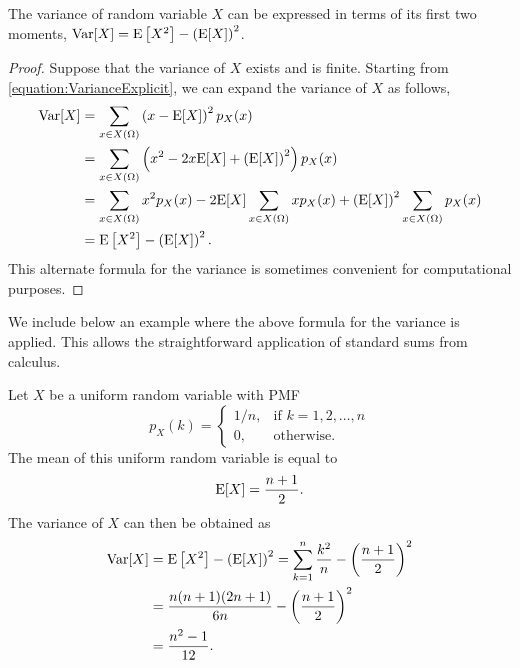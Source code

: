\begin{proposition}
The variance of random variable $X$ can be expressed in terms of its first two moments,
$\mathrm{Var} [X] = \mathrm{E} \left[ X^2 \right] - \left( \mathrm{E} [X] \right)^2$.
\end{proposition}
\begin{proof}
Suppose that the variance of $X$ exists and is finite.
Starting from \eqref{equation:VarianceExplicit}, we can expand the variance of $X$ as follows,
\begin{equation*}
\begin{split}
\mathrm{Var} [X] &= \sum_{x \in X(\Omega)} \left( x - \mathrm{E} [X] \right)^2 p_X (x) \\
&= \sum_{x \in X(\Omega)} \left( x^2 - 2 x \mathrm{E} [X] + \left( \mathrm{E} [X] \right)^2 \right) p_X (x) \\
&= \sum_{x \in X(\Omega)} x^2 p_X (x) - 2 \mathrm{E} [X] \sum_{x \in X(\Omega)} x p_X (x) + \left( \mathrm{E} [X] \right)^2 \sum_{x \in X(\Omega)} p_X (x) \\
&= \mathrm{E} \left[ X^2 \right] - \left( \mathrm{E} [X] \right)^2.
\end{split}
\end{equation*}
This alternate formula for the variance is sometimes convenient for computational purposes.
\end{proof}

We include below an example where the above formula for the variance is applied.
This allows the straightforward application of standard sums from calculus.

\begin{example}
Let $X$ be a uniform random variable with PMF
\begin{equation*}
p_X (k) = \left\{ \begin{array}{ll}
1/n, & \text{if }k = 1, 2, \ldots, n \\
0, & \text{otherwise} .
\end{array} \right.
\end{equation*}
The mean of this uniform random variable is equal to
\begin{equation*}
\mathrm{E} [X] = \frac{n+1}{2} .
\end{equation*}
The variance of $X$ can then be obtained as
\begin{equation*}
\begin{split}
\mathrm{Var} [X] &= \mathrm{E} \left[ X^2 \right] - \left( \mathrm{E} [X] \right)^2
= \sum_{k=1}^n \frac{k^2}{n} - \left( \frac{n+1}{2} \right)^2 \\
&= \frac{n(n+1)(2n+1)}{6n} - \left( \frac{n+1}{2} \right)^2 \\
&= \frac{n^2 - 1}{12} .
\end{split}
\end{equation*}
\end{example}

